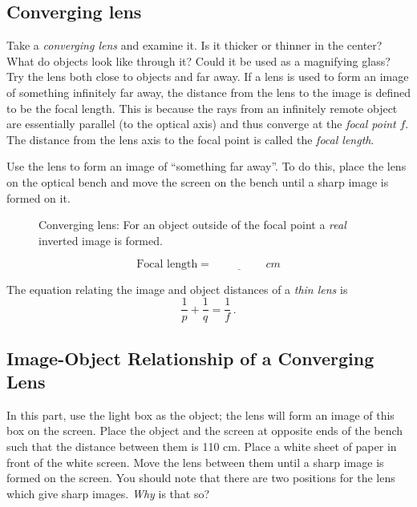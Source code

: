 \documentclass[11pt, a4paper]{article}
\begin{document}
\subsection{Converging lens}
Take a \textit{converging lens} and examine it.
Is it thicker or thinner in the center?
What do objects look like through it?
Could it be used as a magnifying glass?
Try the lens both close to objects and far away.
\fillwithlines{3cm}
If a lens is used to form an image of something infinitely far away, the
distance from the lens to the image is defined to be the focal length. 
This is because the rays from an infinitely remote object are essentially
parallel (to the optical axis) and thus converge at the \textit{focal point} $f$.
The distance from the lens axis to the focal point is called the
\textit{focal length}.

Use the lens to form an image of “something far away”. 
To do this, place the lens on the optical bench and move the screen on the
bench until a sharp image is formed on it. 
\begin{figure}[tbh]
    \centering
    \def\svgwidth{\textwidth}
    
    \caption{Converging lens: For an object outside of the focal point a \textit{real}
    inverted image is formed.}
    \label{fig:convLens}
\end{figure}
\begin{equation*}
    \text{Focal length} = \underline{\hspace{2cm}}\si{cm}
\end{equation*}

The equation relating the image and object distances of a \textit{thin lens} is
\begin{equation}
    \frac{1}{p} + \frac{1}{q} = \frac{1}{f}\,.
    \label{eq:f}
\end{equation}

\subsection{Image-Object Relationship of a Converging Lens}
In this part, use the light box as the object; the lens will form an image of
this box on the screen.
Place the object and the screen at opposite ends of the bench such that the
distance between them is 110 cm.
Place a white sheet of paper in front of the white screen. 
Move the lens between them until a sharp image is formed on the screen.
You should note that there are two positions for the lens which give sharp
images. \textit{Why} is that so?
\fillwithlines{3cm}
\end{document}

